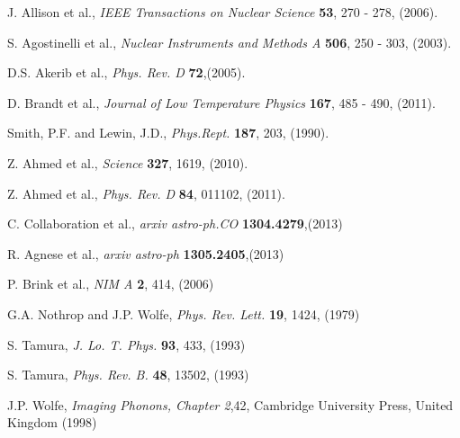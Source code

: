 \documentclass[final,3p,times,twocolumn]{elsarticle}
\begin{document}
%
%
\begin{thebibliography}{99}

J. Allison et al., {\it IEEE Transactions on Nuclear Science} \textbf{53}, 270 - 278, (2006).

S. Agostinelli et al., {\it Nuclear Instruments and Methods A} \textbf{506}, 250 - 303, (2003).

D.S. Akerib et al., {\it Phys. Rev. D} \textbf{72},(2005).

D. Brandt et al., {\it Journal of Low Temperature Physics} \textbf{167}, 485 - 490, (2011).

Smith, P.F. and Lewin, J.D., {\it Phys.Rept.} \textbf{187}, 203, (1990).


Z. Ahmed et al., {\it Science} \textbf{327}, 1619, (2010).

Z. Ahmed et al., {\it Phys. Rev. D} \textbf{84}, 011102, (2011).

C. Collaboration et al., {\it arxiv astro-ph.CO} \textbf{1304.4279},(2013)

R. Agnese et al., {\it arxiv astro-ph} \textbf{1305.2405},(2013)





P. Brink et al., {\it NIM A} \textbf{2}, 414, (2006)


G.A. Nothrop and J.P. Wolfe, {\it Phys. Rev. Lett.} \textbf{19}, 1424, (1979)

S. Tamura, {\it J. Lo. T. Phys.} \textbf{93}, 433, (1993)

S. Tamura, {\it Phys. Rev. B.} \textbf{48}, 13502, (1993)

J.P. Wolfe, {\it Imaging Phonons, Chapter 2},42, Cambridge University Press, United Kingdom (1998) 


\end{thebibliography}
\end{document}

